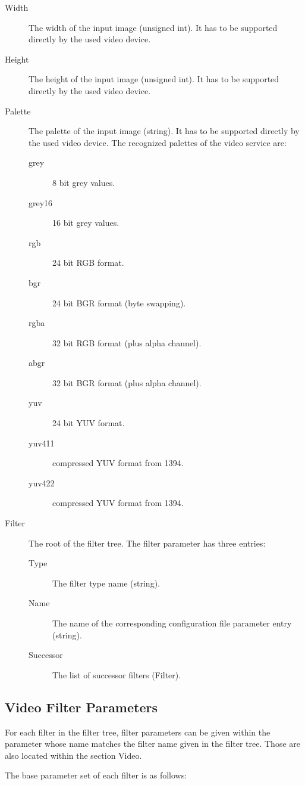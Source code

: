 \begin{description}
\item[Width] The width of the input image (unsigned int).
  It has to be supported directly by the used video device.
\item[Height] The height of the input image (unsigned int).
  It has to be supported directly by the used video device.
\item[Palette] The palette of the input image (string).
  It has to be supported directly by the used video device.
  The recognized palettes of the video service are:
  \begin{description}
  \item[grey] 8 bit grey values.
  \item[grey16] 16 bit grey values.
  \item[rgb] 24 bit RGB format.
  \item[bgr] 24 bit BGR format (byte swapping).
  \item[rgba] 32 bit RGB format (plus alpha channel).
  \item[abgr] 32 bit BGR format (plus alpha channel).
  \item[yuv] 24 bit YUV format.
  \item[yuv411] compressed YUV format from 1394.
  \item[yuv422] compressed YUV format from 1394.
  \end{description}
\item[Filter] The root of the filter tree. The filter parameter
  has three entries:
  \begin{description}
  \item[Type] The filter type name (string).
  \item[Name] The name of the corresponding configuration file
    parameter entry (string).
    \item[Successor] The list of successor filters (Filter).
  \end{description}
\end{description}

\subsection{Video Filter Parameters}

For each filter in the filter tree, filter parameters can be given
within the parameter whose name matches the filter name given in the
filter tree. Those are also located within the section Video.

The base parameter set of each filter is as follows:

